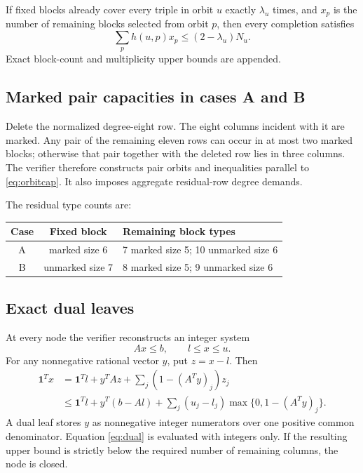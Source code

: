\documentclass[11pt]{article}
\begin{document}
If fixed blocks already cover every triple in orbit $u$ exactly $\lambda_u$ times, and $x_p$ is the number of remaining blocks selected from orbit $p$, then every completion satisfies
\begin{equation}
\sum_p h(u,p)x_p\le(2-\lambda_u)N_u.
\label{eq:orbitcap}
\end{equation}
Exact block-count and multiplicity upper bounds are appended.

\subsection{Marked pair capacities in cases A and B}
Delete the normalized degree-eight row. The eight columns incident with it are marked. Any pair of the remaining eleven rows can occur in at most two marked blocks; otherwise that pair together with the deleted row lies in three columns. The verifier therefore constructs pair orbits and inequalities parallel to \eqref{eq:orbitcap}. It also imposes aggregate residual-row degree demands.

The residual type counts are:
\begin{center}
\begin{tabular}{ccl}
\toprule
Case & Fixed block & Remaining block types\\
\midrule
A & marked size 6 & 7 marked size 5; 10 unmarked size 6\\
B & unmarked size 7 & 8 marked size 5; 9 unmarked size 6\\
\bottomrule
\end{tabular}
\end{center}

\subsection{Exact dual leaves}
At every node the verifier reconstructs an integer system
\[
Ax\le b,\qquad l\le x\le u.
\]
For any nonnegative rational vector $y$, put $z=x-l$. Then
\begin{align}
\mathbf1^Tx
&=\mathbf1^Tl+y^TAz+\sum_j(1-(A^Ty)_j)z_j\\
&\le\mathbf1^Tl+y^T(b-Al)
 +\sum_j(u_j-l_j)\max\{0,1-(A^Ty)_j\}.
\label{eq:dual}
\end{align}
A dual leaf stores $y$ as nonnegative integer numerators over one positive common denominator. Equation \eqref{eq:dual} is evaluated with integers only. If the resulting upper bound is strictly below the required number of remaining columns, the node is closed.
\end{document}
